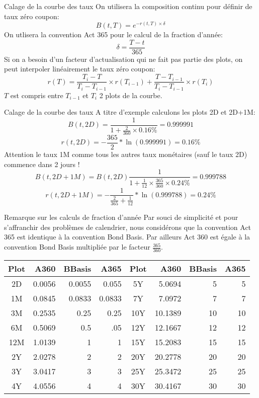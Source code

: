 \documentclass{beamer}
\begin{document}
\begin{frame}{Calage de la courbe des taux}
On utilisera la composition continu pour définir de taux zéro coupon:
\[
B(t,T)=e^{-r(t,T) \times \delta }	
\]
On utlisera la convention Act 365 pour le calcul de la fraction d'année:
\[
\delta = \frac{T-t}{365}
\]
Si on a besoin d'un facteur d'actualisation qui ne fait pas partie des plots, on peut interpoler linéairement le taux zéro coupon:
\[
r(T)=\frac{T_{i}-T}{T_{i}-T_{i-1}}\times r(T_{i-1})+\frac{T-T_{i-1}}{T_{i}-T_{i-1}} \times r(T_{i})
\]
$T$ est compris entre $T_{i-1}$ et $T_{i}$ 2 plots de la courbe.
\end{frame}
\begin{frame}{Calage de la courbe des taux}
A titre d'exemple calculons les plots 2D et 2D+1M:\\
\[
B(t,2D)=\frac{1}{1+\frac{2}{360} \times 0.16\%}=0.999991
\]
\[r(t,2D)=-\frac{365}{2}*\ln(0.999991)=0.16\%
\]
Attention le taux 1M comme tous les autres taux monétaires (sauf le taux 2D) commence dans 2 jours !
\[
B(t,2D+1M)=B(t,2D)\frac{1}{1+\frac{1}{12} \times \frac{365}{360}  \times 0.24\%}=0.999788
\]
\[r(t,2D+1M)=-\frac{1}{\frac{2}{365}+\frac{1}{12}}*\ln(0.999788)=0.24\%
\]
\end{frame}

\begin{frame}{Remarque sur les calculs de fraction d'année}
Par souci de simplicité et pour s'affranchir des problèmes de calendrier, nous considérons que la convention Act 365 est identique à la convention Bond Basis. Par ailleurs Act 360 est égale à la convention Bond Basis multipliée par le facteur $\frac{365}{360}$.
\newline
\newline
\begin{tabular}{|c|r|r|r|c|r|r|r|}
  \hline
   Plot & A360 & BBasis & A365 & Plot & A360 & BBasis & A365 \\
  \hline
 2D & 0.0056 & 0.0055 & 0.055 & 5Y & 5.0694 & 5 & 5\\
 1M & 0.0845 & 0.0833 & 0.0833 & 7Y & 7.0972 & 7 & 7 \\
 3M & 0.2535 & 0.25 & 0.25 & 10Y & 10.1389 & 10 & 10 \\
 6M & 0.5069 & 0.5 & .05  & 12Y & 12.1667 & 12 & 12 \\
 12M & 1.0139 & 1 & 1 & 15Y & 15.2083 & 15 & 15 \\
 2Y & 2.0278 & 2 & 2 & 20Y & 20.2778 & 20 & 20 \\
 3Y & 3.0417 & 3 & 3 & 25Y & 25.3472 & 25 & 25 \\
 4Y & 4.0556 & 4 & 4 & 30Y & 30.4167 & 30 & 30 \\
  \hline
\end{tabular}

\end{frame}
\end{document}
